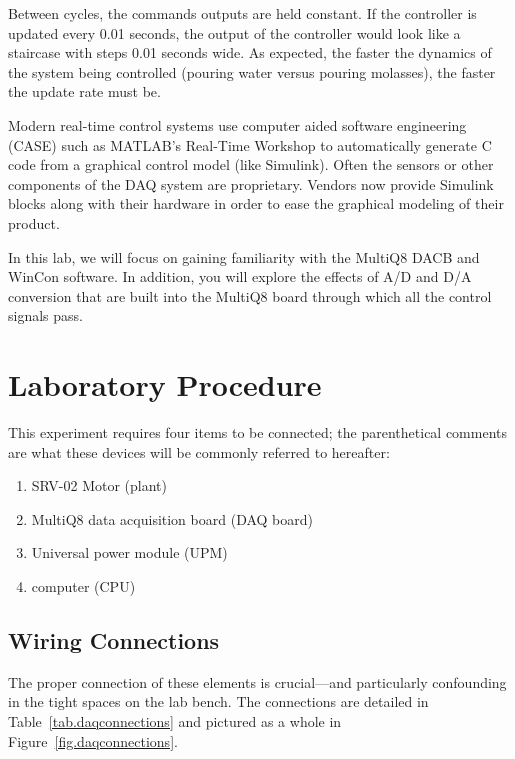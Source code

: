 Between cycles, the commands outputs are held constant.  If the controller is updated every 0.01 seconds, the output of the controller would look like a staircase with steps 0.01 seconds wide.  As expected, the faster the dynamics of the system being controlled (pouring water versus pouring molasses), the faster the update rate must be.
\par
Modern real-time control systems use computer aided software engineering (CASE) such as MATLAB's Real-Time Workshop to automatically generate C code from a graphical control model (like Simulink).  Often the sensors or other components of the DAQ system are proprietary.  Vendors now provide Simulink blocks along with their hardware in order to ease the graphical modeling of their product.
\par
In this lab, we will focus on gaining familiarity with the MultiQ8 DACB and WinCon software.  In addition, you will explore the effects of A/D and D/A conversion that are built into the MultiQ8 board through which all the control signals pass.

\section{Laboratory Procedure}
This experiment requires four items to be connected; the parenthetical comments are what these devices will be commonly referred to hereafter:
\begin{enumerate}
\item SRV-02 Motor (plant)
\item MultiQ8 data acquisition board (DAQ board)
\item Universal power module (UPM)
\item computer (CPU)
\end{enumerate}

\subsection{Wiring Connections}
The proper connection of these elements is crucial---and particularly confounding in the tight spaces on the lab bench.  The connections are detailed in Table~\ref{tab.daqconnections} and pictured as a whole in Figure~\ref{fig.daqconnections}.

